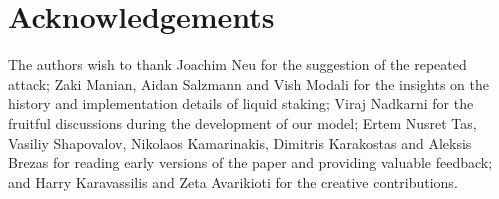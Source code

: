 \section{Acknowledgements}

The authors wish to thank Joachim Neu for the suggestion of the repeated attack;
Zaki Manian, Aidan Salzmann and Vish Modali for the insights on the history and
implementation details of liquid staking;
Viraj Nadkarni for the fruitful discussions during the
development of our model; Ertem Nusret Tas, Vasiliy Shapovalov,
Nikolaos Kamarinakis, Dimitris Karakostas and Aleksis Brezas for reading
early versions of the paper and providing valuable feedback; and Harry Karavassilis
and Zeta Avarikioti for the creative contributions.
